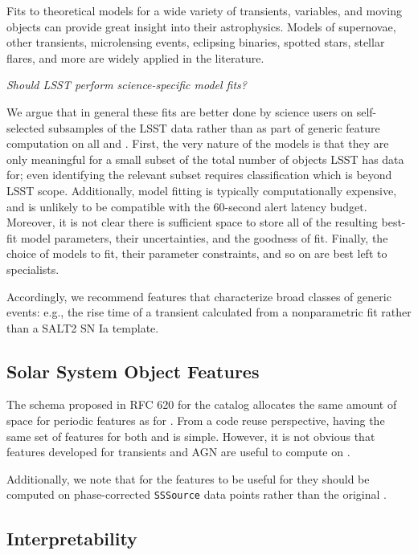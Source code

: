 \documentclass[DM,authoryear,toc]{lsstdoc}
\begin{document}
Fits to theoretical models for a wide variety of transients, variables, and moving objects can provide great insight into their astrophysics.
Models of supernovae, other transients, microlensing events, eclipsing binaries, spotted stars, stellar flares, and more are widely applied in the literature.

\textit{Should LSST perform science-specific model fits?}

We argue that in general these fits are better done by science users on self-selected subsamples of the LSST data rather than as part of generic feature computation on all \DIAObjects and \Objects.
First, the very nature of the models is that they are only meaningful for a small subset of the total number of objects LSST has data for; even identifying the relevant subset requires classification which is beyond LSST scope.
Additionally, model fitting is typically computationally expensive, and is unlikely to be compatible with the 60-second alert latency budget.
Moreover, it is not clear there is sufficient space to store all of the resulting best-fit model parameters, their uncertainties, and the goodness of fit.
Finally, the choice of models to fit, their parameter constraints, and so on are best left to specialists.

Accordingly, we recommend features that characterize broad classes of generic events: e.g., the rise time of a transient calculated from a nonparametric fit rather than a SALT2 SN Ia template.


\subsection{Solar System Object Features}

The schema proposed in RFC 620 for the \SSObject catalog allocates the same amount of space for periodic
features as for \DIAObjects.
From a code reuse perspective, having the same set of features for both \DIAObjects and \SSObjects is simple.
However, it is not obvious that features developed for transients and AGN are useful to compute on \SSObjects.

Additionally, we note that for the features to be useful for \SSObjects they should be computed on phase-corrected \texttt{SSSource} data points rather than the original \DIASources.

\subsection{Interpretability} \label{sec:interpretability}
\end{document}

